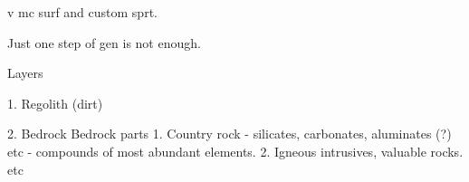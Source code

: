 
v mc surf and custom sprt.

Just one step of gen is not enough.

Layers

1. Regolith (dirt)

2. Bedrock
Bedrock parts
1. Country rock - silicates, carbonates, aluminates (?) etc - compounds of most abundant elements.
2. Igneous intrusives, valuable rocks.
etc